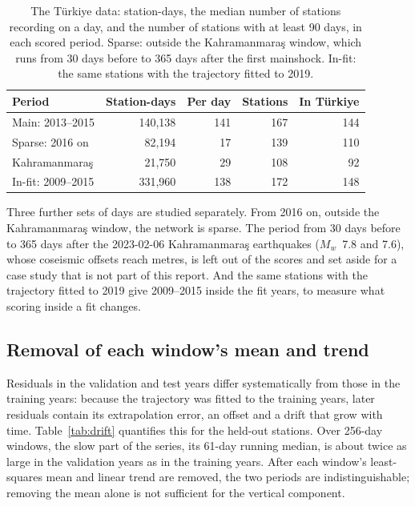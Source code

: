 \documentclass[preprint,12pt,authoryear]{elsarticle}
\begin{document}
\begin{table}[t]
  \centering
  \caption{The T\"urkiye data: station-days, the median number of stations recording on a
    day, and the number of stations with at least 90 days, in each scored period. Sparse:
    outside the Kahramanmara\c{s} window, which runs from 30 days before to 365 days after
  the first mainshock. In-fit: the same stations with the trajectory fitted to 2019.}
  \label{tab:turkiye}
  \small
  \begin{tabular}{lrrrr}
    \toprule
    Period & Station-days & Per day & Stations & In T\"urkiye \\
    \midrule
    Main: 2013--2015 & 140,138 & 141 & 167 & 144 \\
    Sparse: 2016 on & 82,194 & 17 & 139 & 110 \\
    Kahramanmara\c{s} & 21,750 & 29 & 108 & 92 \\
    In-fit: 2009--2015 & 331,960 & 138 & 172 & 148 \\
    \bottomrule
  \end{tabular}
\end{table}

Three further sets of days are studied separately. From 2016 on, outside the
Kahramanmara\c{s} window, the network is sparse. The period from 30 days before to 365
days after the 2023-02-06 Kahramanmara\c{s} earthquakes ($M_w$~7.8 and 7.6), whose
coseismic offsets reach metres, is left out of the scores and set aside for a case study
that is not part of this report. And the same stations with the
trajectory fitted to 2019 give 2009--2015 inside the fit years, to measure what scoring
inside a fit changes.

\subsection{Removal of each window's mean and trend}
\label{sec:detrend}

Residuals in the validation and test years differ systematically from those in the
training years: because the trajectory was fitted to the training years, later residuals
contain its extrapolation error, an offset and a drift that grow with time.
Table~\ref{tab:drift} quantifies this for the held-out stations. Over 256-day windows,
the slow part of the series, its 61-day running median, is about twice as large in the
validation years as in the training years. After each window's least-squares mean and
linear trend are removed, the two periods are indistinguishable; removing the mean alone
is not sufficient for the vertical component.
\end{document}
